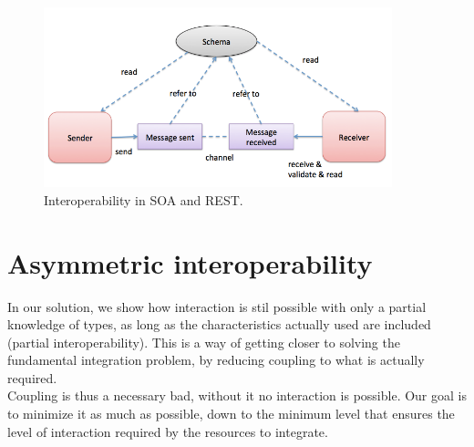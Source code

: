  \begin{figure}[!htb]
   \centering
   \includegraphics[width=0.9\textwidth]{Figures/schema.png}
   \caption[Interoperability in SOA and REST.]{Interoperability in SOA and REST.}
   \label{fig:interoperability}
 \end{figure}

 \section{Asymmetric interoperability}
 \label{section:AsymmetricInteroperability}

In our solution, we show how interaction is stil possible with only a partial knowledge of types, as long as the
characteristics actually used are included (partial interoperability). This is a way of getting closer to solving the
fundamental integration problem, by reducing coupling to what is actually required.\\

Coupling is thus a necessary bad, without it no interaction is possible. Our goal is to minimize it as much as
possible, down to the minimum level that ensures the level of interaction required by the resources to integrate.\\

